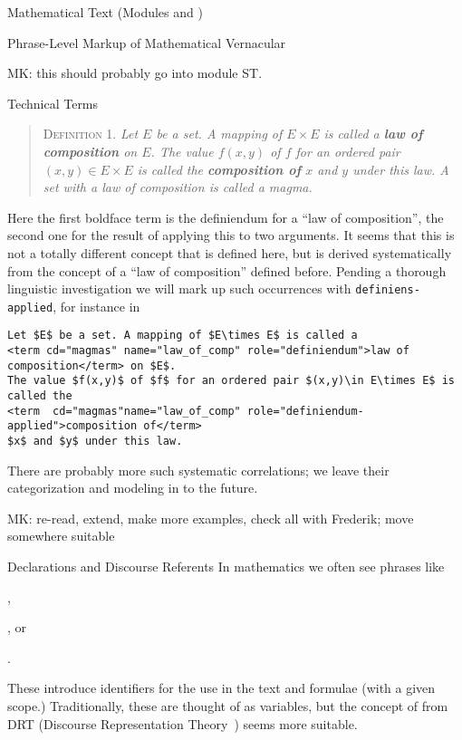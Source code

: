 \begin{tchapter}[id=mtxt,short=Mathematical Text]{Mathematical Text (Modules
   and )}
\begin{tsection}[id=phrases]{Phrase-Level Markup of Mathematical Vernacular}
\begin{oldpart}{MK: this should probably go into module ST.}
\begin{tsubsection}[id=terms]{Technical Terms}
\begin{quote}
  \textsc{Definition 1.} \emph{Let $E$ be a set. A mapping of $E\times E$ is called a
    {\bf{law of composition}} on $E$. The value $f(x,y)$ of $f$ for an ordered pair
    $(x,y)\in E\times E$ is called the {\bf{composition of}} $x$ and $y$ under this law.
    A set with a law of composition is called a magma.}
\end{quote}
Here the first boldface term is the definiendum for a ``law of composition'', the second
one for the result of applying this to two arguments. It seems that this is not a totally
different concept that is defined here, but is derived systematically from the concept of
a ``law of composition'' defined before. Pending a thorough linguistic investigation we
will mark up such occurrences with \texttt{definiens-applied}, for instance in

\begin{lstlisting}[mathescape,caption={Marking up the Technical Terms},label=lst:terms]
Let $E$ be a set. A mapping of $E\times E$ is called a 
<term cd="magmas" name="law_of_comp" role="definiendum">law of composition</term> on $E$. 
The value $f(x,y)$ of $f$ for an ordered pair $(x,y)\in E\times E$ is called the 
<term  cd="magmas"name="law_of_comp" role="definiendum-applied">composition of</term>
$x$ and $y$ under this law.
\end{lstlisting}
There are probably more such systematic correlations; we leave their categorization and
modeling in \omdoc to the future.
\end{tsubsection}
\end{oldpart}
\end{tsection}

\begin{newpart}{MK: re-read, extend, make more examples, check all with Frederik; move
    somewhere suitable}
\begin{tsection}[id=declarations]{Declarations and Discourse Referents}
  In mathematics we often see phrases like 
  \begin{compactenum}
  \item {}, 
  \item {}, or
  \item {}.
  \end{compactenum}
  These introduce identifiers for the use in the text and formulae (with a given scope.)
  Traditionally, these are thought of as variables, but the concept of  from DRT (Discourse Representation Theory~\cite{KamRey:acffodrs96}) seems
  more suitable.


\end{tsection}
\end{newpart}
\end{tchapter}

